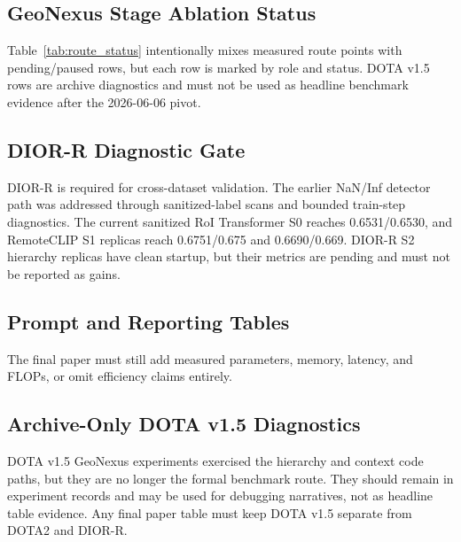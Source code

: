 \documentclass[10pt]{article}
\begin{document}
\subsection{GeoNexus Stage Ablation Status}



Table~\ref{tab:route_status} intentionally mixes measured route points with pending/paused rows, but each row is marked by role and status. DOTA v1.5 rows are archive diagnostics and must not be used as headline benchmark evidence after the 2026-06-06 pivot.

\subsection{DIOR-R Diagnostic Gate}

DIOR-R is required for cross-dataset validation. The earlier NaN/Inf detector path was addressed through sanitized-label scans and bounded train-step diagnostics. The current sanitized RoI Transformer S0 reaches 0.6531/0.6530, and RemoteCLIP S1 replicas reach 0.6751/0.675 and 0.6690/0.669. DIOR-R S2 hierarchy replicas have clean startup, but their metrics are pending and must not be reported as gains.



\subsection{Prompt and Reporting Tables}



The final paper must still add measured parameters, memory, latency, and FLOPs, or omit efficiency claims entirely.

\subsection{Archive-Only DOTA v1.5 Diagnostics}

DOTA v1.5 GeoNexus experiments exercised the hierarchy and context code paths, but they are no longer the formal benchmark route. They should remain in experiment records and may be used for debugging narratives, not as headline table evidence. Any final paper table must keep DOTA v1.5 separate from DOTA2 and DIOR-R.
\end{document}

